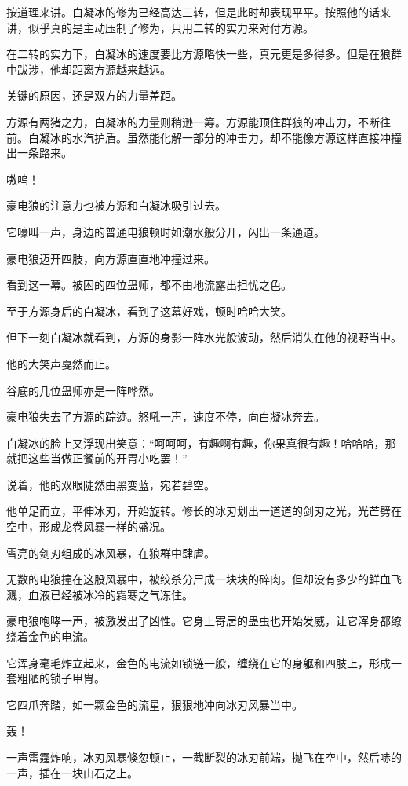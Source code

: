 \begin{this_body}
按道理来讲。白凝冰的修为已经高达三转，但是此时却表现平平。按照他的话来讲，似乎真的是主动压制了修为，只用二转的实力来对付方源。

在二转的实力下，白凝冰的速度要比方源略快一些，真元更是多得多。但是在狼群中跋涉，他却距离方源越来越远。

关键的原因，还是双方的力量差距。

方源有两猪之力，白凝冰的力量则稍逊一筹。方源能顶住群狼的冲击力，不断往前。白凝冰的水汽护盾。虽然能化解一部分的冲击力，却不能像方源这样直接冲撞出一条路来。

嗷呜！

豪电狼的注意力也被方源和白凝冰吸引过去。

它嚎叫一声，身边的普通电狼顿时如潮水般分开，闪出一条通道。

豪电狼迈开四肢，向方源直直地冲撞过来。

看到这一幕。被困的四位蛊师，都不由地流露出担忧之色。

至于方源身后的白凝冰，看到了这幕好戏，顿时哈哈大笑。

但下一刻白凝冰就看到，方源的身影一阵水光般波动，然后消失在他的视野当中。

他的大笑声戛然而止。

谷底的几位蛊师亦是一阵哗然。

豪电狼失去了方源的踪迹。怒吼一声，速度不停，向白凝冰奔去。

白凝冰的脸上又浮现出笑意：“呵呵呵，有趣啊有趣，你果真很有趣！哈哈哈，那就把这些当做正餐前的开胃小吃罢！”

说着，他的双眼陡然由黑变蓝，宛若碧空。

他单足而立，平伸冰刃，开始旋转。修长的冰刃划出一道道的剑刃之光，光芒劈在空中，形成龙卷风暴一样的盛况。

雪亮的剑刃组成的冰风暴，在狼群中肆虐。

无数的电狼撞在这股风暴中，被绞杀分尸成一块块的碎肉。但却没有多少的鲜血飞溅，血液已经被冰冷的霜寒之气冻住。

豪电狼咆哮一声，被激发出了凶性。它身上寄居的蛊虫也开始发威，让它浑身都缭绕着金色的电流。

它浑身毫毛炸立起来，金色的电流如锁链一般，缠绕在它的身躯和四肢上，形成一套粗陋的锁子甲胄。

它四爪奔踏，如一颗金色的流星，狠狠地冲向冰刃风暴当中。

轰！

一声雷霆炸响，冰刃风暴倏忽顿止，一截断裂的冰刃前端，抛飞在空中，然后哧的一声，插在一块山石之上。


\end{this_body}
